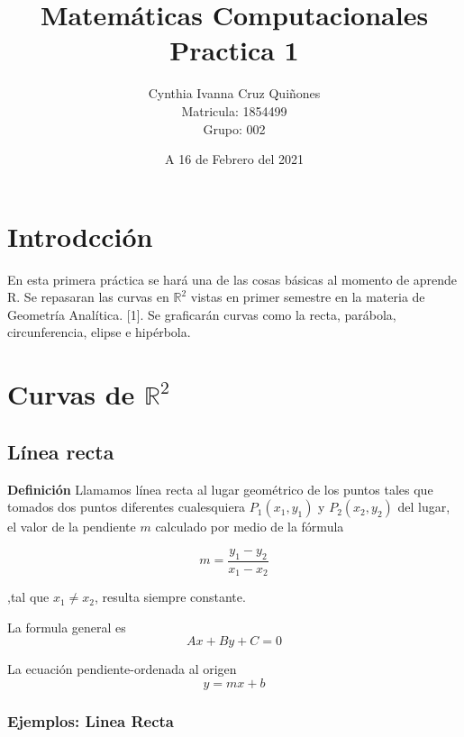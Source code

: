 \documentclass[12pt,a4paper]{article} %
\author{Cynthia Ivanna Cruz Quiñones\\
Matricula: 1854499\\
Grupo: 002}
\title{Matemáticas Computacionales\\
Practica 1}
\date{A 16 de Febrero del 2021}
\begin{document}
\maketitle

\newpage
\tableofcontents

\newpage

\section{Introdcción}
En esta primera práctica se hará una de las cosas básicas al momento de aprende R. Se
repasaran las curvas en $\mathbb{R}^2$ vistas en primer semestre en la materia de Geometría Analítica. [1].
Se graficarán curvas como la recta, parábola, circunferencia, elipse e hipérbola.

\section{Curvas de $\mathbb{R}^2$} \label{sec:curvas}

\subsection{Línea recta} \label{subsec:linearecta}
\textbf{Definición}
Llamamos línea recta al lugar geométrico de los puntos tales que tomados dos puntos diferentes cualesquiera $P_{1}(x_{1}, y_{1})$ y $P_{2}(x_{2}, y_{2})$ del lugar, el valor de la pendiente $m$ calculado por medio de la fórmula 

$$ m = \frac{y_{1} - y_{2}}{x_{1} - x_{2}}$$ 

,tal que  ${x_{1}\neq x_{2}}$, resulta siempre constante. 

La formula general es
$$Ax + By + C = 0$$

La ecuación pendiente-ordenada al origen
$$y = mx + b$$

\subsubsection{Ejemplos: Linea Recta}
\end{document}
